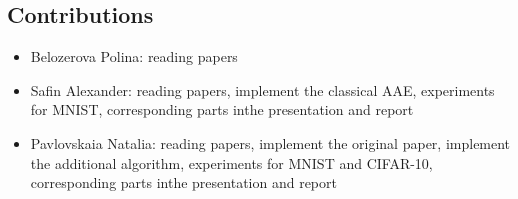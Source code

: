 \documentclass{article}
\begin{document}
    \subsection{Contributions}
    \begin{itemize}
        \item Belozerova Polina: reading papers
        \item Safin Alexander: reading papers, implement the classical AAE,
        experiments for MNIST, corresponding parts inthe presentation and report
        \item Pavlovskaia Natalia: reading papers, implement the original paper, implement the additional algorithm,
        experiments for MNIST and CIFAR-10, corresponding parts inthe presentation and report
    \end{itemize}

    
    
\end{document}

